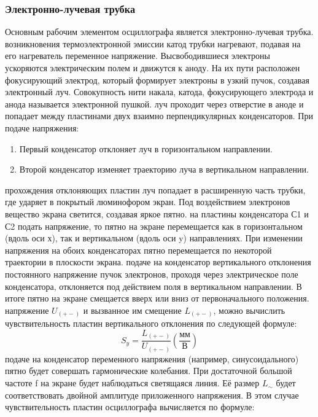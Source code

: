 \subsubsection{Электронно-лучевая трубка}
Основным рабочим элементом осциллографа является электронно-лучевая трубка.
 возникновения термоэлектронной эмиссии катод трубки нагревают, подавая на его нагреватель переменное напряжение. Высвободившиеся электроны ускоряются электрическим полем и движутся к аноду. На их пути расположен фокусирующий электрод, который формирует электроны в узкий пучок, создавая электронный луч. Совокупность нити накала, катода, фокусирующего электрода и анода называется электронной пушкой.
 луч проходит через отверстие в аноде и попадает между пластинами двух взаимно перпендикулярных конденсаторов. При подаче напряжения:
\begin{enumerate}
    \item Первый конденсатор отклоняет луч в горизонтальном направлении.
   \item Второй конденсатор изменяет траекторию луча в вертикальном направлении.
\end{enumerate}
 прохождения отклоняющих пластин луч попадает в расширенную часть трубки, где ударяет в покрытый люминофором экран. Под воздействием электронов вещество экрана светится, создавая яркое пятно.
 на пластины конденсатора С1 и С2  подать напряжение, то пятно на экране перемещается как в горизонтальном (вдоль оси х), так и вертикальном (вдоль
оси y) направлениях. При изменении напряжения на обоих конденсаторах пятно перемещается по некоторой траектории в плоскости экрана. 
 подаче на конденсатор вертикального отклонения постоянного
напряжение пучок электронов, проходя через электрическое поле конденсатора, отклоняется под действием поля в вертикальном направлении. В итоге пятно на экране смещается вверх или вниз от первоначального положения. 
 напряжение $U_{(+-)}$ и вызванное им смещение $L_{(+-)}$, можно вычислить чувствительность пластин вертикального отклонения по следующей формуле:
\begin{equation}
    S_{y}=\frac{L_{(+-)}}{U_{(+-)} }(\frac{\text{мм}}{\text{В}})
\end{equation}
 подаче на конденсатор переменного напряжения (например, синусоидального) пятно будет совершать гармонические колебания. При достаточной большой частоте f на экране будет наблюдаться светящаяся линия. Её размер $L_{\sim}$ будет соответствовать  двойной амплитуде приложенного напряжения. В этом случае чувствительность пластин осциллографа вычисляется по формуле:
